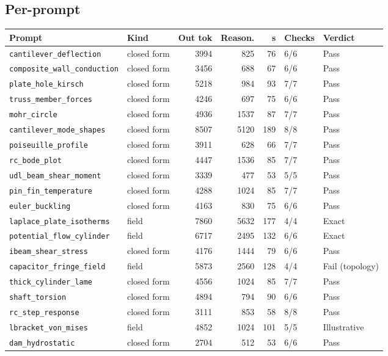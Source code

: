 \documentclass[11pt,a4paper]{article}
\begin{document}
\subsection{Per-prompt}
{\small
\begin{longtable}{llrrrll}
\toprule
Prompt & Kind & Out tok & Reason. & s & Checks & Verdict \\
\midrule
\endhead
\texttt{cantilever\_deflection} & closed form & 3994 & 825 & 76 & 6/6 & Pass \\
\texttt{composite\_wall\_conduction} & closed form & 3456 & 688 & 67 & 6/6 & Pass \\
\texttt{plate\_hole\_kirsch} & closed form & 5218 & 984 & 93 & 7/7 & Pass \\
\texttt{truss\_member\_forces} & closed form & 4246 & 697 & 75 & 6/6 & Pass \\
\texttt{mohr\_circle} & closed form & 4936 & 1537 & 87 & 7/7 & Pass \\
\texttt{cantilever\_mode\_shapes} & closed form & 8507 & 5120 & 189 & 8/8 & Pass \\
\texttt{poiseuille\_profile} & closed form & 3911 & 628 & 66 & 7/7 & Pass \\
\texttt{rc\_bode\_plot} & closed form & 4447 & 1536 & 85 & 7/7 & Pass \\
\texttt{udl\_beam\_shear\_moment} & closed form & 3339 & 477 & 53 & 5/5 & Pass \\
\texttt{pin\_fin\_temperature} & closed form & 4288 & 1024 & 85 & 7/7 & Pass \\
\texttt{euler\_buckling} & closed form & 4163 & 830 & 75 & 6/6 & Pass \\
\texttt{laplace\_plate\_isotherms} & field & 7860 & 5632 & 177 & 4/4 & Exact \\
\texttt{potential\_flow\_cylinder} & field & 6717 & 2495 & 132 & 6/6 & Exact \\
\texttt{ibeam\_shear\_stress} & closed form & 4176 & 1444 & 79 & 6/6 & Pass \\
\texttt{capacitor\_fringe\_field} & field & 5873 & 2560 & 128 & 4/4 & Fail (topology) \\
\texttt{thick\_cylinder\_lame} & closed form & 4556 & 1024 & 85 & 7/7 & Pass \\
\texttt{shaft\_torsion} & closed form & 4894 & 794 & 90 & 6/6 & Pass \\
\texttt{rc\_step\_response} & closed form & 3111 & 853 & 58 & 8/8 & Pass \\
\texttt{lbracket\_von\_mises} & field & 4852 & 1024 & 101 & 5/5 & Illustrative \\
\texttt{dam\_hydrostatic} & closed form & 2704 & 512 & 53 & 6/6 & Pass \\
\bottomrule
\end{longtable}
}
\end{document}

